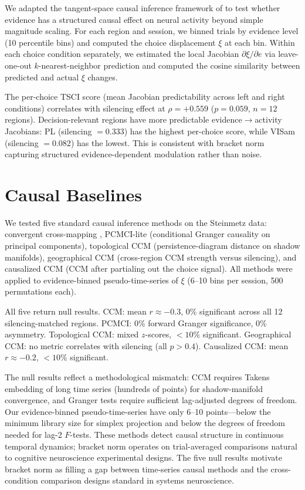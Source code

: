 \documentclass{article}
\begin{document}
We adapted the tangent-space causal inference framework of \citet{butler2024tsci} to test whether evidence has a structured causal effect on neural activity beyond simple magnitude scaling. For each region and session, we binned trials by evidence level (10 percentile bins) and computed the choice displacement $\xi$ at each bin. Within each choice condition separately, we estimated the local Jacobian $\partial \xi / \partial e$ via leave-one-out $k$-nearest-neighbor prediction and computed the cosine similarity between predicted and actual $\xi$ changes.

The per-choice TSCI score (mean Jacobian predictability across left and right conditions) correlates with silencing effect at $\rho = +0.559$ ($p = 0.059$, $n = 12$ regions). Decision-relevant regions have more predictable evidence$\to$activity Jacobians: PL (silencing $= 0.333$) has the highest per-choice score, while VISam (silencing $= 0.082$) has the lowest. This is consistent with bracket norm capturing structured evidence-dependent modulation rather than noise.

\section{Causal Baselines}
\label{app:causal_baselines}

We tested five standard causal inference methods on the Steinmetz data: convergent cross-mapping \citep[CCM;][]{sugihara2012detecting}, PCMCI-lite (conditional Granger causality on principal components), topological CCM (persistence-diagram distance on shadow manifolds), geographical CCM (cross-region CCM strength versus silencing), and causalized CCM (CCM after partialing out the choice signal). All methods were applied to evidence-binned pseudo-time-series of $\xi$ (6--10 bins per session, 500 permutations each).

All five return null results. CCM: mean $r \approx -0.3$, 0\% significant across all 12 silencing-matched regions. PCMCI: 0\% forward Granger significance, 0\% asymmetry. Topological CCM: mixed $z$-scores, $< 10$\% significant. Geographical CCM: no metric correlates with silencing (all $p > 0.4$). Causalized CCM: mean $r \approx -0.2$, $< 10$\% significant.

The null results reflect a methodological mismatch: CCM requires Takens embedding of long time series (hundreds of points) for shadow-manifold convergence, and Granger tests require sufficient lag-adjusted degrees of freedom. Our evidence-binned pseudo-time-series have only 6--10 points---below the minimum library size for simplex projection and below the degrees of freedom needed for lag-2 $F$-tests. These methods detect causal structure in continuous temporal dynamics; bracket norm operates on trial-averaged comparisons natural to cognitive neuroscience experimental designs. The five null results motivate bracket norm as filling a gap between time-series causal methods and the cross-condition comparison designs standard in systems neuroscience.
\end{document}
